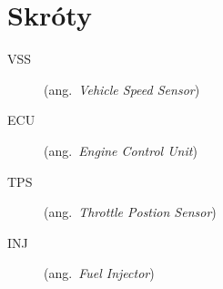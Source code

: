 \chapter*{Skróty}\mbox{}
\label{sec:skroty}
\noindent
\begin{description}
  \item [VSS] (ang.\ \emph{Vehicle Speed Sensor})
  \item [ECU] (ang.\ \emph{Engine Control Unit})
  \item [TPS] (ang.\ \emph{Throttle Postion Sensor})
  \item [INJ] (ang.\ \emph{Fuel Injector})
\end{description}
